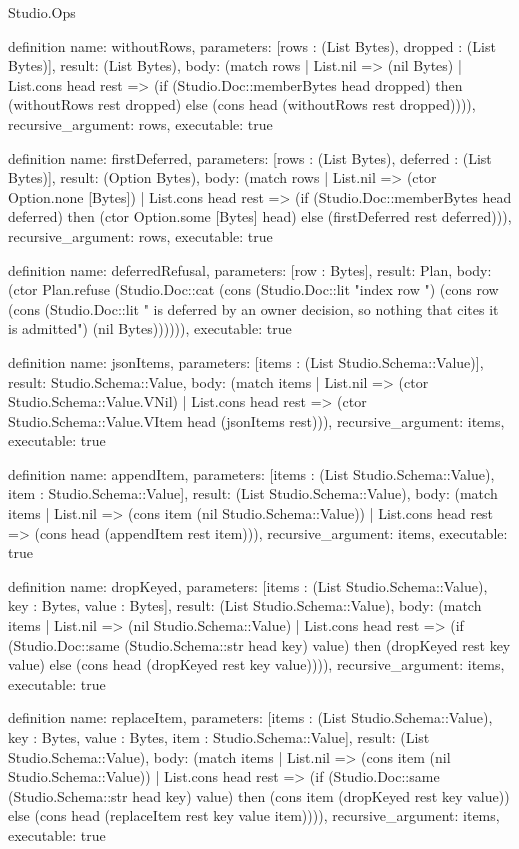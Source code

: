 \begin{lexlean}{Studio.Ops}
\begin{semanticmodule}
definition{
  name: withoutRows,
  parameters: [rows : (List Bytes), dropped : (List Bytes)],
  result: (List Bytes),
  body: (match rows
    | List.nil => (nil Bytes)
    | List.cons head rest => (if (Studio.Doc::memberBytes head dropped) then (withoutRows rest dropped) else (cons head (withoutRows rest dropped)))),
  recursive_argument: rows,
  executable: true
}

definition{
  name: firstDeferred,
  parameters: [rows : (List Bytes), deferred : (List Bytes)],
  result: (Option Bytes),
  body: (match rows
    | List.nil => (ctor Option.none [Bytes])
    | List.cons head rest => (if (Studio.Doc::memberBytes head deferred) then (ctor Option.some [Bytes] head) else (firstDeferred rest deferred))),
  recursive_argument: rows,
  executable: true
}

definition{
  name: deferredRefusal,
  parameters: [row : Bytes],
  result: Plan,
  body: (ctor Plan.refuse (Studio.Doc::cat (cons (Studio.Doc::lit "index row ") (cons row (cons (Studio.Doc::lit " is deferred by an owner decision, so nothing that cites it is admitted\n") (nil Bytes)))))),
  executable: true
}

definition{
  name: jsonItems,
  parameters: [items : (List Studio.Schema::Value)],
  result: Studio.Schema::Value,
  body: (match items
    | List.nil => (ctor Studio.Schema::Value.VNil)
    | List.cons head rest => (ctor Studio.Schema::Value.VItem head (jsonItems rest))),
  recursive_argument: items,
  executable: true
}


definition{
  name: appendItem,
  parameters: [items : (List Studio.Schema::Value), item : Studio.Schema::Value],
  result: (List Studio.Schema::Value),
  body: (match items
    | List.nil => (cons item (nil Studio.Schema::Value))
    | List.cons head rest => (cons head (appendItem rest item))),
  recursive_argument: items,
  executable: true
}

definition{
  name: dropKeyed,
  parameters: [items : (List Studio.Schema::Value), key : Bytes, value : Bytes],
  result: (List Studio.Schema::Value),
  body: (match items
    | List.nil => (nil Studio.Schema::Value)
    | List.cons head rest => (if (Studio.Doc::same (Studio.Schema::str head key) value) then (dropKeyed rest key value) else (cons head (dropKeyed rest key value)))),
  recursive_argument: items,
  executable: true
}

definition{
  name: replaceItem,
  parameters: [items : (List Studio.Schema::Value), key : Bytes, value : Bytes, item : Studio.Schema::Value],
  result: (List Studio.Schema::Value),
  body: (match items
    | List.nil => (cons item (nil Studio.Schema::Value))
    | List.cons head rest => (if (Studio.Doc::same (Studio.Schema::str head key) value) then (cons item (dropKeyed rest key value)) else (cons head (replaceItem rest key value item)))),
  recursive_argument: items,
  executable: true
}




\end{semanticmodule}
\end{lexlean}
